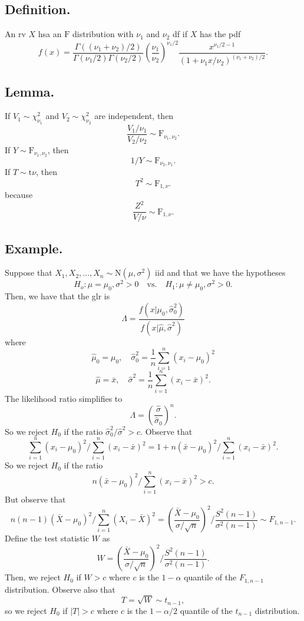 \documentclass[titlepage]{article}
\begin{document}
\subsection{Definition.} An rv $X$ hsa an $\text{F}$ distribution with $\nu_{1}$ and $\nu_{2}$ df if $X$ has the pdf 
$$f(x) = \frac{\Gamma((\nu_{1}+\nu_{2})/2)}{\Gamma(\nu_{1}/2)\Gamma(\nu_{2}/2)}\left(\frac{\nu_{1}}{\nu_{2}}\right)^{\nu_{1}/2}\frac{x^{\nu_{1}/2-1}}{(1 + \nu_{1}x/\nu_{2})^{(\nu_{1}+\nu_{2})/2}}.$$

\subsection{Lemma.} If $V_{1} \sim \chi_{\nu_{1}}^{2}$ and $V_{2} \sim \chi_{\nu_{2}}^{2}$ are independent, then
$$\frac{V_{1}/\nu_{1}}{V_{2}/\nu_{2}} \sim \text{F}_{\nu_{1}, \nu_{2}}.$$
If $Y \sim \text{F}_{\nu_{1}, \nu_{2}}$, then 
$$1/Y \sim \text{F}_{\nu_{2}, \nu_{1}}.$$
If $T \sim \text{t}{\nu}$, then 
$$T^{2} \sim \text{F}_{1, \nu}.$$
because 
$$\frac{Z^{2}}{V/\nu} \sim \text{F}_{1, \nu}.$$

\subsection{Example.} Suppose that $X_{1}, X_{2}, \ldots, X_{n} \sim \text{N}(\mu, \sigma^{2})$ iid and that we have the hypotheses 
$$H_{o}: \mu = \mu_{0}, \sigma^{2} > 0 \quad \text{vs.} \quad H_{1}: \mu \neq \mu_{0}, \sigma^{2} > 0.$$
Then, we have that the glr is 
$$\Lambda = \frac{f(x|\mu_{0}, \hat{\sigma}_{0}^{2})}{f(x|\hat{\mu}, \hat{\sigma}^{2})}$$
where 
$$\hat{\mu}_{0} = \mu_{0}, \quad \hat{\sigma}_{0}^{2} = \frac{1}{n}\sum_{i=1}^{n}(x_{i} - \mu_{0})^{2}$$
$$\hat{\mu} = \bar{x}, \quad \hat{\sigma}^{2} = \frac{1}{n}\sum_{i=1}^{n}(x_{i} - \bar{x})^{2}.$$
The likelihood ratio simplifies to 
$$\Lambda = \left(\frac{\hat{\sigma}}{\hat{\sigma}_{0}}\right)^{n}.$$
So we reject $H_{0}$ if the ratio $\hat{\sigma}^{2}_{0}/\hat{\sigma}^{2} > c$. Observe that 
$$\sum_{i=1}^{n}(x_{i}-\mu_{0})^{2} / \sum_{i=1}^{n}(x_{i}-\bar{x})^{2} = 1 + n(\bar{x} - \mu_{0})^{2}/\sum_{i=1}^{n}(x_{i}-\bar{x})^{2}.$$
So we reject $H_{0}$ if the ratio
$$n(\bar{x} - \mu_{0})^{2}/\sum_{i=1}^{n}(x_{i}-\bar{x})^{2} > c.$$
But observe that 
$$n(n-1)(\bar{X} - \mu_{0})^{2}/\sum_{i=1}^{n}(X_{i} - \bar{X})^{2} = \left(\frac{\bar{X}-\mu_{0}}{\sigma/\sqrt{n}}\right)^{2} / \frac{S^{2}(n-1)}{\sigma^{2}(n-1)} \sim F_{1, n-1}.$$
Define the test statistic $W$ as 
$$W = \left(\frac{\bar{X}-\mu_{0}}{\sigma/\sqrt{n}}\right)^{2} / \frac{S^{2}(n-1)}{\sigma^{2}(n-1)}.$$
Then, we reject $H_{0}$ if $W > c$ where $c$ is the $1-\alpha$ quantile of the $F_{1, n-1}$ distribution. Observe also that 
$$T = \sqrt{W} \sim t_{n-1},$$
so we reject $H_{0}$ if $|T| > c$ where $c$ is the $1-\alpha/2$ quantile of the $t_{n-1}$ distribution.
\end{document}
